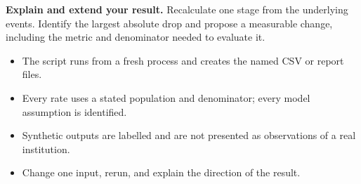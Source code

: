 \begin{verification}
\textbf{Explain and extend your result.} Recalculate one stage from the underlying events. Identify the largest absolute drop and propose a measurable change, including the metric and denominator needed to evaluate it.

\begin{itemize}\item The script runs from a fresh process and creates the named CSV or report files.\item Every rate uses a stated population and denominator; every model assumption is identified.\item Synthetic outputs are labelled and are not presented as observations of a real institution.\item Change one input, rerun, and explain the direction of the result.\end{itemize}\end{verification}
